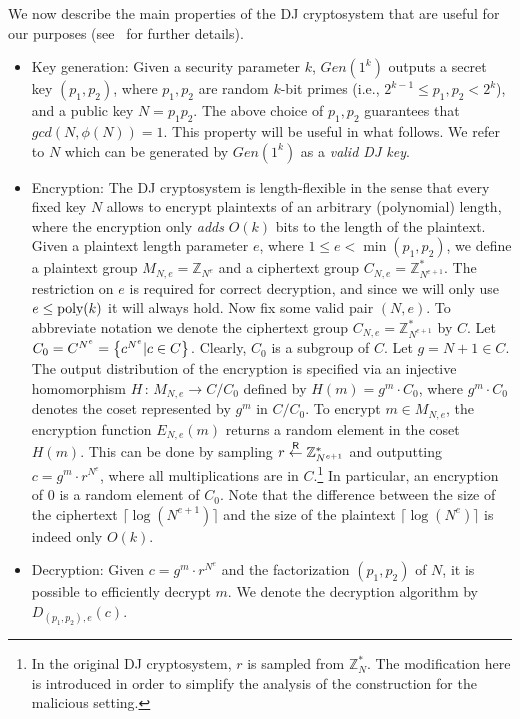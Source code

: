 \documentclass[11pt]{article}
\newcommand{\poly}{{\mbox{\rm poly}}}
\newcommand{\gendj}{Gen}
\newcommand{\encdj}{{E}_{N,e}}
\newcommand{\decdj}{{D}_{(p_1,p_2),e}}
\newcommand{\Z}{\mathbb{Z}}
\newcommand{\U}[1]{\mathbb{Z}_{#1}^*}
\newcommand{\mathify}[1]{\ifmmode{#1}\else\mbox{$#1$}\fi}
\newcommand{\set}[2][]{\mathify{{\left\{#2\right\}}^{#1}}}
\newcommand{\condset}[2]{\set{#1|#2}}
\newcommand{\fnrngdom}[2]{#1\to#2}
\newcommand{\fndef}[3]{{#1\,:\,\fnrngdom{#2}{#3}}}
\newcommand{\usamp}[2]{#1\stackrel{\footnotesize{\sf R}}{\leftarrow}#2}
\begin{document}
We now describe the main properties of the DJ cryptosystem that are
useful for our purposes (see~\cite{DJ01} for further details).
\begin{itemize}
 \item{\sc Key generation:} Given a security parameter $k$,
$\gendj(1^k)$ outputs a secret key $(p_1,p_2)$, where $p_1,p_2$ are
random $k$-bit primes (i.e., $2^{k-1}\le p_1,p_2<2^k$), and a
public key $N=p_1p_2$. The above choice of $p_1,p_2$ guarantees
that $gcd(N,\phi(N))=1$. This property will be useful in what
follows. We refer to $N$ which can be generated by $\gendj(1^k)$ as
a {\em valid DJ key}.
 \item{\sc Encryption:} The DJ cryptosystem is length-flexible in the
sense that every fixed key $N$ allows to encrypt plaintexts of an
arbitrary (polynomial) length, where the encryption only {\em adds}
$O(k)$ bits to the length of the plaintext. Given a plaintext
length parameter $e$, where $1\leq e<\min{(p_1,p_2)}$, we define a
plaintext group $M_{N,e}=\Z_{N^e}$ and a ciphertext group
$C_{N,e}=\U{N^{e+1}}$.  The restriction on $e$ is required for
correct decryption, and since we will only use $e\le\poly(k)$ it
will always hold.
Now fix some valid pair $(N,e)$. To abbreviate notation we denote
the ciphertext group $C_{N,e}=\U{N^{e+1}}$ by $C$. Let
$C_0=C^{N^e}=\condset{c^{N^e}}{c\in C}$. Clearly, $C_0$ is a
subgroup of $C$. Let $g=N+1\in C$. The output distribution of the
encryption is specified via an injective homomorphism
$\fndef{H}{M_{N,e}}{C/C_0}$
defined by $H(m)=g^m\cdot C_0$, where $g^m\cdot C_0$ denotes the
coset represented by $g^m$ in $C/C_0$. To encrypt $m\in M_{N,e}$,
the encryption function $\encdj(m)$ returns a random element in the
coset $H(m)$. This can be done by sampling $\usamp{r}{\U{N^{e+1}}}$
and outputting $c=g^m\cdot{r^{N^e}}$, where all multiplications are
in $C$.\footnote{In the original DJ cryptosystem, $r$ is sampled
from $\U{N}$. The modification here is introduced in order to
simplify the analysis of the construction for the malicious
setting.} In particular, an encryption of $0$ is a random element
of $C_0$. Note that the difference between the size of the
ciphertext $\lceil\log (N^{e+1})\rceil$ and the size of the
plaintext $\lceil\log (N^e)\rceil$ is indeed only $O(k)$.

\item{\sc Decryption:} Given $c=g^m\cdot{r^{N^e}}$ and the
factorization $(p_1,p_2)$ of $N$, it is possible to efficiently
decrypt $m$. We denote the decryption algorithm by $\decdj(c)$.


\end{itemize}
\end{document}
